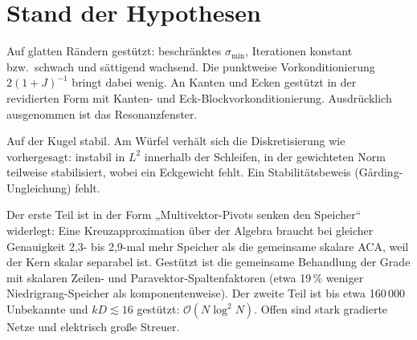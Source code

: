 \documentclass[11pt, a4paper]{article}
\begin{document}
\section{Stand der Hypothesen}
\begin{description}[font=\normalfont\bfseries, style=nextline, leftmargin=1.2em]
  \item[H1 (Stabilität):] Auf glatten Rändern gestützt: beschränktes $\sigma_{\min}$,
    Iterationen konstant bzw.\ schwach und sättigend wachsend. Die punktweise
    Vorkonditionierung $2(1+J)^{-1}$ bringt dabei wenig. An Kanten und Ecken gestützt in der
    revidierten Form mit Kanten- und Eck-Blockvorkonditionierung. Ausdrücklich ausgenommen
    ist das Resonanzfenster.
  \item[H2 (Diskretisierung):] Auf der Kugel stabil. Am Würfel verhält sich die Diskretisierung
    wie vorhergesagt: instabil in $L^2$ innerhalb der Schleifen, in der gewichteten Norm
    teilweise stabilisiert, wobei ein Eckgewicht fehlt. Ein Stabilitätsbeweis
    (Gårding-Ungleichung) fehlt.
  \item[H3 (Kompression):] Der erste Teil ist in der Form „Multivektor-Pivots senken den
    Speicher“ widerlegt: Eine Kreuzapproximation über der Algebra braucht bei gleicher Genauigkeit
    2,3- bis 2,9-mal mehr Speicher als die gemeinsame skalare ACA, weil der Kern skalar separabel ist.
    Gestützt ist die gemeinsame Behandlung der Grade mit skalaren Zeilen- und Paravektor-Spaltenfaktoren
    (etwa 19\,\% weniger Niedrigrang-Speicher als komponentenweise). Der zweite Teil ist bis etwa 160\,000 Unbekannte und $kD\lesssim16$
    gestützt: $\mathcal{O}(N\log^2N)$. Offen sind stark gradierte Netze und elektrisch große
    Streuer.
\end{description}

\end{document}

